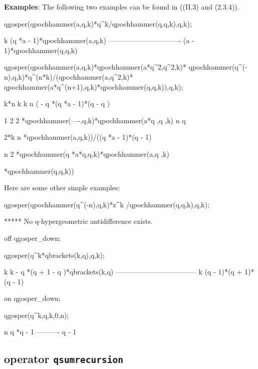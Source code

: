 \textbf{Examples}: The following two examples can be found in
	\cite{GasperRahman:90} ((II.3) and (2.3.4)).

\begin{redoutput}
\redprompt qgosper(qpochhammer(a,q,k)*q^k/qpochhammer(q,q,k),q,k);

   k
 (q *a - 1)*qpochhammer(a,q,k)
-------------------------------
  (a - 1)*qpochhammer(q,q,k)

\redprompt qgosper(qpochhammer(a,q,k)*qpochhammer(a*q^2,q^2,k)*
   qpochhammer(q^(-n),q,k)*q^(n*k)/(qpochhammer(a,q^2,k)*
   qpochhammer(a*q^(n+1),q,k)*qpochhammer(q,q,k)),q,k);

    k*n   k          k    n
( - q   *(q *a - 1)*(q  - q )

               1                       2  2
 *qpochhammer(----,q,k)*qpochhammer(a*q ,q ,k)
                n
               q

                         2*k          n
 *qpochhammer(a,q,k))/((q   *a - 1)*(q  - 1)

                 n                         2
   *qpochhammer(q *a*q,q,k)*qpochhammer(a,q ,k)

   *qpochhammer(q,q,k))
\end{redoutput}

Here are some other simple examples:
\begin{redoutput}
\redprompt qgosper(qpochhammer(q^(-n),q,k)*z^k
                    /qpochhammer(q,q,k),q,k);

***** No q-hypergeometric antidifference exists.

\redprompt off qgosper_down;

\redprompt qgosper(q^k*qbrackets(k,q),q,k);

     k           k
  - q *(q + 1 - q )*qbrackets(k,q)
-----------------------------------
       k
     (q  - 1)*(q + 1)*(q - 1)

\redprompt on qgosper_down;

\redprompt qgosper(q^k,q,k,0,n);

  n
 q *q - 1
----------
  q - 1
\end{redoutput}
%
\subsection{\REDUCE{} operator \texttt{qsumrecursion}}
\label{reduce_qsumrecursion}

